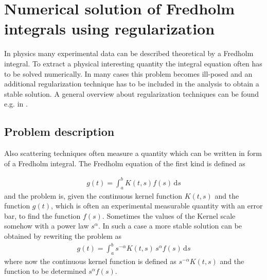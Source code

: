 \chapter{Numerical solution of Fredholm integrals using regularization}
In physics many experimental data can be described theoretical by a Fredholm integral. To extract a physical interesting quantity the integral equation often has to be solved numerically. In many cases this problem becomes ill-posed and an additional regularization technique has to be included in the analysis to obtain a stable solution. A general overview about regularization techniques can be found e.g. in \cite{Hansen1998,Hansen2000b,Gazzola2018,Scherzer2011,Kern2016}.


\section{Problem description}
Also scattering techniques often measure  a quantity which can be written in form of a Fredholm integral.
The Fredholm equation of the first kind is defined as

\begin{align}
\label{eq:Fredholm}
g(t)=\int _{a}^{b}K(t,s)f(s)\,\mathrm {d} s
\end{align}
and the problem is, given the continuous kernel function $K(t,s)$ and the function $g(t)$, which is often an experimental measurable quantity with an error bar, to find the function $f(s)$. Sometimes the values of the Kernel scale somehow with a power law $s^\alpha$. In such a case a more stable solution can be obtained by rewriting the problem as
\begin{align}
\label{eq:KernelScaling}
g(t)=\int _{a}^{b}s^{-\alpha} K(t,s) \, s^{\alpha}f(s)\,\mathrm {d} s
\end{align}
where now the continuous kernel function is defined as $s^{-\alpha}K(t,s)$ and the function to be determined $s^{\alpha} f(s)$.

